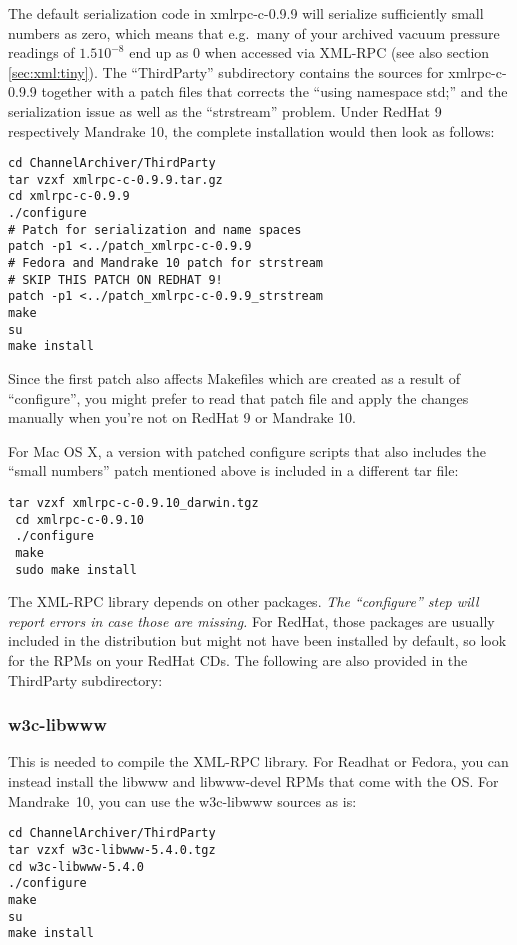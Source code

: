 \NOTE The default serialization code in xmlrpc-c-0.9.9 will serialize
sufficiently small numbers as zero, which means that e.g.\ many of
your archived vacuum pressure readings of $1.5 10^{-8}$ end up as $0$
when accessed via XML-RPC (see also section \ref{sec:xml:tiny}).
The ``ThirdParty'' subdirectory contains the sources for xmlrpc-c-0.9.9
together with a patch files that corrects the ``using namespace std;'' and
the serialization issue as well as the ``strstream'' problem.
Under RedHat 9 respectively Mandrake 10, the complete installation would
then look as follows:

\begin{lstlisting}[keywordstyle=\sffamily]
cd ChannelArchiver/ThirdParty
tar vzxf xmlrpc-c-0.9.9.tar.gz
cd xmlrpc-c-0.9.9
./configure
# Patch for serialization and name spaces
patch -p1 <../patch_xmlrpc-c-0.9.9
# Fedora and Mandrake 10 patch for strstream
# SKIP THIS PATCH ON REDHAT 9!
patch -p1 <../patch_xmlrpc-c-0.9.9_strstream
make
su
make install
\end{lstlisting}

\noindent Since the first patch also affects Makefiles which are
created as a result of ``configure'', you might prefer to read that
patch file and apply the changes manually when you're not on RedHat 9
or Mandrake 10.

For Mac OS X, a version with patched configure scripts
\cite{darwinports} that also includes the ``small numbers'' patch
mentioned above is included in a different tar file:
\begin{lstlisting}[keywordstyle=\sffamily]
 tar vzxf xmlrpc-c-0.9.10_darwin.tgz
 cd xmlrpc-c-0.9.10
 ./configure 
 make
 sudo make install
\end{lstlisting}

The XML-RPC library depends on other packages. \emph{The ``configure''
step will report errors in case those are missing.} For RedHat, those
packages are usually included in the distribution but might not have
been installed by default, so look for the RPMs on your RedHat CDs.
The following are also provided in the ThirdParty subdirectory:

\subsubsection{w3c-libwww}
This is needed to compile the XML-RPC library.
For Readhat or Fedora, you can instead install the libwww
and libwww-devel RPMs that come with the OS.
For Mandrake~10, you can use the w3c-libwww sources as is:
\begin{lstlisting}[keywordstyle=\sffamily]
cd ChannelArchiver/ThirdParty
tar vzxf w3c-libwww-5.4.0.tgz
cd w3c-libwww-5.4.0
./configure
make
su
make install
\end{lstlisting}

